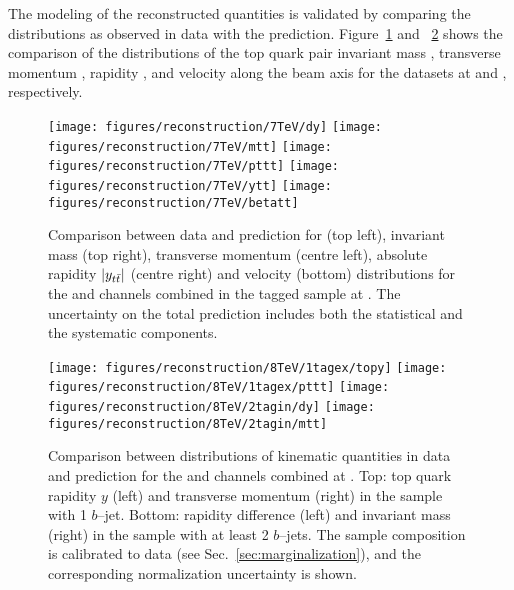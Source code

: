 The modeling of the reconstructed quantities is validated by comparing
the distributions as observed in data with the prediction. 
Figure~\ref{fig:datamcreco2011} and ~\ref{fig:datamcreco2012}
shows the comparison of the distributions of
the top quark pair invariant mass \mtt{}, transverse momentum \pttt{},
rapidity \ytt{}, and velocity along the beam axis \betatt{} for the
datasets at \seventev{} and \eighttev{}, respectively.
%                                   
\begin{figure}[!htb]\centering
  \texttt{[image: figures/reconstruction/7TeV/dy]}
  \texttt{[image: figures/reconstruction/7TeV/mtt]}
  \texttt{[image: figures/reconstruction/7TeV/pttt]}
  \texttt{[image: figures/reconstruction/7TeV/ytt]}
  \texttt{[image: figures/reconstruction/7TeV/betatt]}
  \caption{Comparison between data and prediction for \dy{} (top
    left), invariant mass \mtt{} (top right), transverse momentum
    \pttt{} (centre left), absolute rapidity $|y_{t\bar{t}}{}|$ (centre right)
    and velocity \betatt{} (bottom) distributions for the \ejets{} and
    \mujets{} channels combined in the tagged sample at
    \seventev{}. The uncertainty on the total prediction includes both
    the statistical and the systematic components.} 
  \label{fig:datamcreco2011}
\end{figure}
%
\begin{figure}[!htb]\centering
  \texttt{[image: figures/reconstruction/8TeV/1tagex/topy]}
  \texttt{[image: figures/reconstruction/8TeV/1tagex/pttt]}
  \texttt{[image: figures/reconstruction/8TeV/2tagin/dy]}
  \texttt{[image: figures/reconstruction/8TeV/2tagin/mtt]}
  \caption{Comparison between distributions of kinematic quantities in
    data and prediction for the \ejets{} and \mujets{} channels
    combined at \eighttev{}. Top: top quark rapidity $y$ (left) and
    transverse momentum \pttt{} (right) in the sample with 1 $b$--jet.
    Bottom: rapidity difference \dy{} (left) and invariant mass \mtt{}
    (right) in the sample with at least 2 $b$--jets.
    The sample composition is calibrated to data (see
    Sec.~\ref{sec:marginalization}), and the corresponding normalization
    uncertainty is shown.} 
  \label{fig:datamcreco2012}
\end{figure}
%

